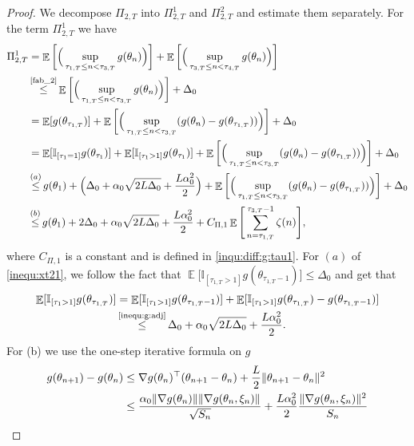 \documentclass[standalone]{article}
\newcommand{\I}{\mathbb{I}}
\DeclareMathOperator{\Expect}{\mathbb{E}}
\begin{document}
\begin{proof}
We decompose $\Pi_{2,T}$ into $\Pi_{2,T}^1$ and $\Pi_{2,T}^2$ and estimate them separately. For the term $\Pi_{2,T}^1$ we have
\begin{align}\label{inequ:xt21}
    \Pi_{2,T}^1& = \Expect\bigg[\Big(\sup_{\tau_{1,T}\le n<\tau_{3,T}}g(\theta_n)\Big)\bigg]+\Expect\bigg[\Big(\sup_{\tau_{3,T}\le n<\tau_{4,T}}g(\theta_n)\Big)\bigg] \notag \\
    & \mathop{\le}^{\text{\cref{fab_2}}} \Expect\bigg[\Big(\sup_{\tau_{1,T}\le n<\tau_{3,T}}g(\theta_n)\Big)\bigg]+\Delta_{0}\notag\\&=\Expect[g(\theta_{\tau_{1,T}})]+\Expect\bigg[\Big(\sup_{\tau_{1,T}\le n<\tau_{3,T}}(g(\theta_n)-g(\theta_{\tau_{1,T}}))\Big)\bigg]+\Delta_{0}\notag\\
&=\Expect[\I_{[\tau_{1}=1]}g(\theta_{\tau_{1}})]+\Expect[\I_{[\tau_{1}>1]}g(\theta_{\tau_{1}})]+\Expect\bigg[\Big(\sup_{\tau_{1,T}\le n<\tau_{3,T}}(g(\theta_n)-g(\theta_{\tau_{1,T}}))\Big)\bigg]+\Delta_{0}\notag\\&\mathop{\le}^{(a)}g(\theta_{1})+\Big(\Delta_{0}+\alpha_{0}\sqrt{2 L\Delta_{0}}+\frac{ L\alpha_{0}^{2}}{2}\Big)+\Expect\bigg[\Big(\sup_{\tau_{1,T}\le n<\tau_{3,T}}(g(\theta_n)-g(\theta_{\tau_{1,T}}))\Big)\bigg] + \Delta_{0}\notag\\&\mathop{\le}^{(b)}g(\theta_{1})+2\Delta_{0}+\alpha_{0}\sqrt{2 L\Delta_{0}}+\frac{ L\alpha_{0}^{2}}{2} + C_{\Pi,1} \Expect\Bigg[\sum_{n=\tau_{1,T}}^{\tau_{3,T}-1} \zeta(n)\Bigg],
\end{align}
where $C_{\Pi,1}$ is a constant and is defined in \cref{inqu:diff:g:tau1}.
For $(a)$ of \cref{inequ:xt21}, we follow the fact that $\Expect\Big[\I_{[\tau_{1,T}>1]}g(\theta_{\tau_{1,T}-1})\Big]\le \Delta_{0}$ and  get that
\begin{align*}
\Expect[\I_{[\tau_{1}>1]}g(\theta_{\tau_{1,T}})]&=\Expect[\I_{[\tau_{1}>1]}g(\theta_{\tau_{1,T}-1})]+\Expect[\I_{[\tau_{1}>1]}g(\theta_{\tau_{1,T}})-g(\theta_{\tau_{1,T}-1})]\\&\mathop{\le}^{\text{\cref{inequ:g:adj}}} \Delta_{0}+\alpha_{0}\sqrt{2 L\Delta_{0}}+\frac{ L\alpha_{0}^{2}}{2}.
\end{align*}
For (b) we use the one-step iterative formula on $g$ 
   \begin{align}\label{inequ:one:g:adj}
       g(\theta_{n+1})-g(\theta_{n})&\le \nabla g(\theta_{n})^{\top}(\theta_{n+1}-\theta_{n})+\frac{ L}{2}\|\theta_{n+1}-\theta_{n}\|^{2} \notag \\&\le\frac{\alpha_{0}\|\nabla g(\theta_{n})\|\|\nabla g(\theta_{n},\xi_{n})\|}{\sqrt{S_{n}}}+\frac{ L\alpha_{0}^{2}}{2}\frac{\|\nabla g(\theta_{n},\xi_{n})\|^{2}}{S_{n}} \notag \\

\end{align}
\end{proof}
\end{document}
